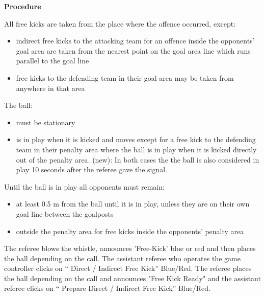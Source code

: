 {\bfseries Procedure}

\headlinebox


All free kicks are taken from the place where the offence occurred, except:
\begin{itemize}
\item indirect free kicks to the attacking team for an offence inside the opponents' goal area are taken from the nearest point on the goal area line which runs parallel to the goal line
\item free kicks to the defending team in their goal area may be taken from anywhere in that area
\end{itemize}

The ball:
\begin{itemize}
\item must be stationary 
\item is in play when it is kicked and  moves   except for a free kick to the defending team in their penalty area where the ball is in play when it is kicked directly out of the penalty area. (new): In both cases the the ball is also considered in play 10 seconds after the referee gave the signal.
\end{itemize}

Until the ball is in play all opponents must remain:
\begin{itemize}
\item at least 0.5 m  from the ball until it is in play, unless they are on their own goal line between the goalposts 
\item outside the penalty area for free kicks inside the opponents' penalty area
\end{itemize}

The referee blows the whistle, announces 'Free-Kick' blue or red and then places the ball depending on the call. The assistant referee who operates the game controller clicks on `` Direct / Indirect Free Kick'' Blue/Red.  The referee places the ball depending on the call and announces "Free Kick Ready" and the assistant referee clicks on `` Prepare Direct / Indirect Free Kick'' Blue/Red. 

